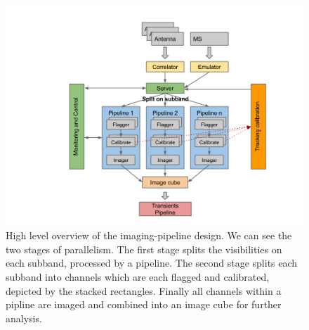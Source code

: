 \documentclass{aa}
\begin{document}

\begin{figure}[tbh]
\includegraphics[width=1\columnwidth]{Figs/pipeline-design}\caption{\label{fig:pipeline}
High level overview of the imaging-pipeline design. We can see the two stages
of parallelism. The first stage splits the visibilities on each subband,
processed by a pipeline.  The second stage splits each subband into channels
which are each flagged and calibrated, depicted by the stacked rectangles.
Finally all channels within a pipline are imaged and combined into an image
cube for further analysis.}
\end{figure}
\end{document}
